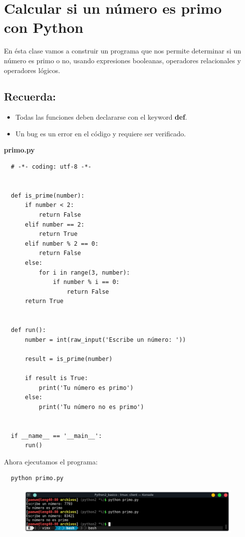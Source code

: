 \documentclass{article}
\begin{document}
\newpage


\section{Calcular si un número es primo con Python}%
En ésta clase vamos a construir un programa que nos permite determinar si un
número es primo o no, usando expresiones booleanas, operadores relacionales y
operadores lógicos.\\

\subsection{Recuerda:}%
\begin{itemize}
  \item Todas las funciones deben declararse con el keyword \textbf{def}.
  \item Un bug es un error en el código y requiere ser verificado.
\end{itemize}

\textbf{primo.py}
\begin{verbatim}
  # -*- coding: utf-8 -*-


  def is_prime(number):
      if number < 2:
          return False
      elif number == 2:
          return True
      elif number % 2 == 0:
          return False
      else:
          for i in range(3, number):
              if number % i == 0:
                  return False
      return True


  def run():
      number = int(raw_input('Escribe un número: '))

      result = is_prime(number)

      if result is True:
          print('Tu número es primo')
      else:
          print('Tu número no es primo')


  if __name__ == '__main__':
      run()
\end{verbatim}

Ahora ejecutamos el programa:

\begin{verbatim}
  python primo.py
\end{verbatim}

\newpage

\begin{figure}[h!]
  \centering
  \includegraphics[scale=0.75]{./Pictures/026_primo.png}
\end{figure}
\end{document}
